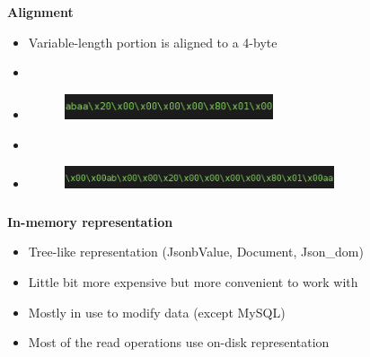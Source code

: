 \documentclass[usenames,dvipsnames, 18pt, compress, aspectratio=169]{beamer}
\begin{document}
\begin{frame}
    \frametitle{}
    \begin{center}
    \textbf{Alignment}

    \begin{itemize}[label={}]
        \item Variable-length portion is aligned to a 4-byte
        \item \inputminted[fontsize=\Large]{sql}{sql/insert_align1.sql}
        \item \begin{figure}
            \includegraphics[width=0.58\textwidth,left]{align_short.png}
        \end{figure}

        \item \inputminted[fontsize=\Large]{sql}{sql/insert_align2.sql}
        \item \begin{figure}
            \includegraphics[width=0.75\textwidth,left]{align_long.png}
        \end{figure}

    \end{itemize}

    \end{center}
\end{frame}

\begin{frame}
    \frametitle{}
    \textbf{In-memory representation}
    \begin{center}
        \begin{itemize}[label={\MVRightarrow}]
            \item Tree-like representation (JsonbValue, Document, Json\_dom)
            \item Little bit more expensive but more convenient to work with
            \item Mostly in use to modify data (except MySQL)
            \item Most of the read operations use on-disk representation
        \end{itemize}
    \end{center}
\end{frame}
\end{document}
